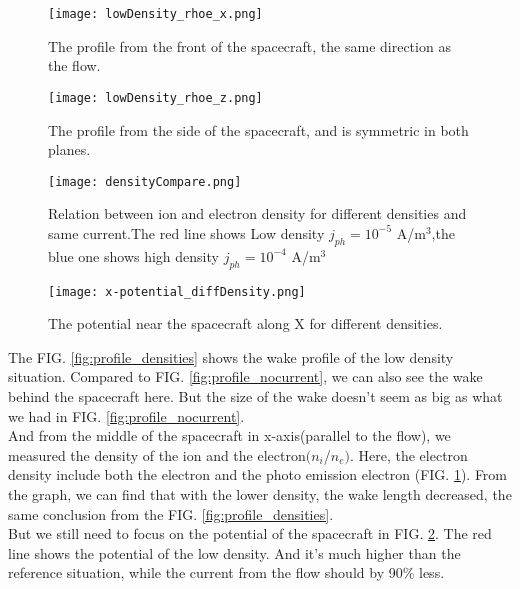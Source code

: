 \documentclass[aip, 
rsi, 
amsmath,
amssymb,
longbibliography,
preprint]{revtex4-1}
\begin{document}
\begin{figure*}[!ht]
\begin{subfigure}{0.45\textwidth}
\texttt{[image: lowDensity\_rhoe\_x.png]}
\caption{The profile from the front of the spacecraft, the same direction as the flow.}
\end{subfigure}
\begin{subfigure}{0.45\textwidth}
\texttt{[image: lowDensity\_rhoe\_z.png]}
\caption{The profile from the side of the spacecraft, and is symmetric in both planes.}
\end{subfigure}
\caption{The situation when we have lowered the density by an order of 1 and the photo emission is $j_{ph} = 10^{-5}$ A/m$^3$} \label{fig:profile_densities}
\end{figure*}

\begin{figure}[!ht]
\texttt{[image: densityCompare.png]}
\caption{Relation between ion and electron density for different densities and same current.The red line shows Low density $j_{ph} = 10^{-5}$ A/m$^3$,the blue one shows high density $j_{ph} = 10^{-4}$ A/m$^3$} \label{fig:densitycompare}
\end{figure}

\begin{figure}[!ht]
\texttt{[image: x-potential\_diffDensity.png]}
\caption{The potential near the spacecraft along X for different densities. \label{fig:end}}
\end{figure}

The FIG. \ref{fig:profile_densities} shows the wake profile of the low density situation. Compared to FIG. \ref{fig:profile_nocurrent}, we can also see the wake behind the spacecraft here. But the size of the wake doesn't seem as big as what we had in FIG. \ref{fig:profile_nocurrent}.\\

And from the middle of the spacecraft in x-axis(parallel to the flow), we measured the density of the ion and the electron$(n_i$/$n_e)$. Here, the electron density include both the electron and the photo emission electron (FIG. \ref{fig:densitycompare}). From the graph, we can find that with the lower density, the wake length decreased, the same conclusion from the FIG. \ref{fig:profile_densities}.\\

But we still need to focus on the potential of the spacecraft in FIG. \ref{fig:end}. The red line shows the potential of the low density. And it's much higher than the reference situation, while the current from the flow should by 90\% less.
\end{document}
